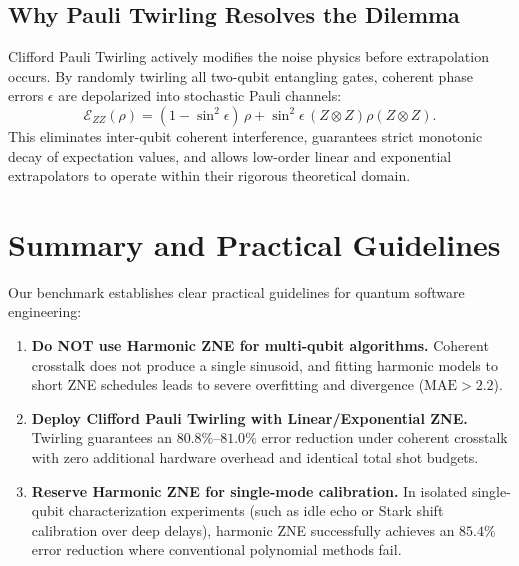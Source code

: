\subsection{Why Pauli Twirling Resolves the Dilemma}
Clifford Pauli Twirling actively modifies the noise physics before extrapolation occurs. By randomly twirling all two-qubit entangling gates, coherent phase errors $\epsilon$ are depolarized into stochastic Pauli channels:
\begin{equation}
\mathcal{E}_{ZZ}(\rho) = (1 - \sin^2\epsilon)\,\rho + \sin^2\epsilon\,(Z \otimes Z)\rho(Z \otimes Z).
\end{equation}
This eliminates inter-qubit coherent interference, guarantees strict monotonic decay of expectation values, and allows low-order linear and exponential extrapolators to operate within their rigorous theoretical domain.

\section{Summary and Practical Guidelines}
Our benchmark establishes clear practical guidelines for quantum software engineering:
\begin{enumerate}
    \item \textbf{Do NOT use Harmonic ZNE for multi-qubit algorithms.} Coherent crosstalk does not produce a single sinusoid, and fitting harmonic models to short ZNE schedules leads to severe overfitting and divergence ($\mathrm{MAE} > 2.2$).
    \item \textbf{Deploy Clifford Pauli Twirling with Linear/Exponential ZNE.} Twirling guarantees an $80.8\%\text{--}81.0\%$ error reduction under coherent crosstalk with zero additional hardware overhead and identical total shot budgets.
    \item \textbf{Reserve Harmonic ZNE for single-mode calibration.} In isolated single-qubit characterization experiments (such as idle echo or Stark shift calibration over deep delays), harmonic ZNE successfully achieves an $85.4\%$ error reduction where conventional polynomial methods fail.
\end{enumerate}
